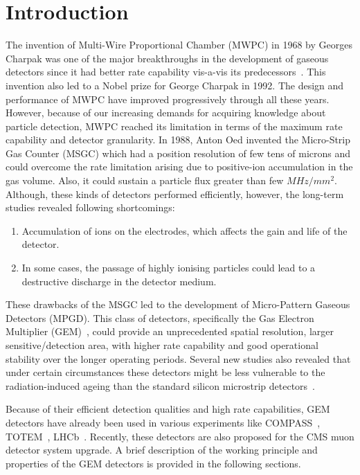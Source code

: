 \section{Introduction} %
\label{sec:introduction}
The invention of Multi-Wire Proportional Chamber (MWPC) in 1968 by Georges Charpak was one of the major breakthroughs in the development of gaseous detectors since it had better rate capability vis-a-vis its predecessors~\cite{Charpak1968}. 
This invention also led to a Nobel prize for George Charpak in 1992. 
The design and performance of MWPC have improved progressively through all these years.
However, because of our increasing demands for acquiring knowledge about particle detection, MWPC reached its limitation in terms of the maximum rate capability and detector granularity.
In 1988, Anton Oed invented the Micro-Strip Gas Counter (MSGC) which had a position resolution of few tens of microns and could overcome the rate limitation arising due to positive-ion accumulation in the gas volume. 
Also, it could sustain a particle flux greater than few $MHz/mm^2$. Although, these kinds of detectors performed efficiently, however, the long-term studies revealed following shortcomings:
\begin{enumerate}
	\item Accumulation of ions on the electrodes, which affects the gain and life of the detector.
	\item In some cases, the passage of highly ionising particles could lead to a destructive discharge in the detector medium.
\end{enumerate}
These drawbacks of the MSGC led to the development of Micro-Pattern Gaseous Detectors (MPGD).
This class of detectors, specifically the Gas Electron Multiplier (GEM)~\cite{Sauli1997,Sauli1999,detector:1732870}, could provide an unprecedented spatial resolution, larger sensitive/detection area, with higher rate capability and good operational stability over the longer operating periods.
Several new studies also revealed that under certain circumstances these detectors might be less vulnerable to the radiation-induced ageing than the standard silicon microstrip detectors~\cite{TITOV2004,Titov2002}.

Because of their efficient detection qualities and high rate capabilities, GEM detectors have already been used in various experiments like COMPASS~\cite{Abbon2007}, TOTEM~\cite{Berardi2004}, LHCb~\cite{Collaboration2008}.
Recently, these detectors are also proposed for the CMS muon detector system upgrade.
A brief description of the working principle and properties of the GEM detectors is provided in the following sections.

